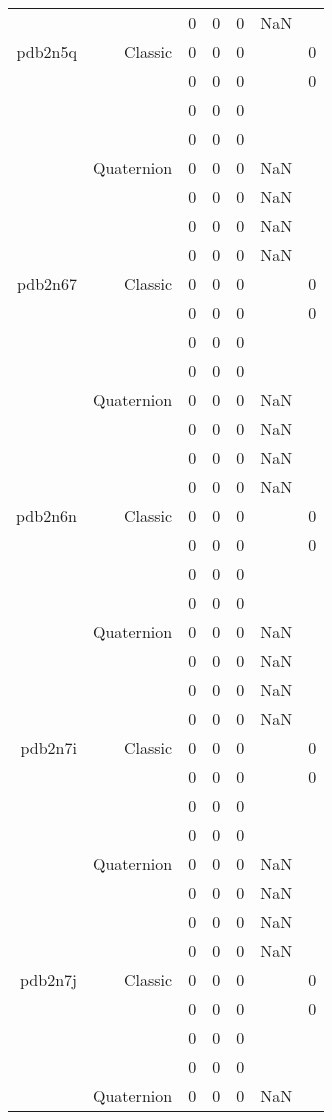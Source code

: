 \begin{xltabular}{\textwidth}{r|rcccSc}
& & 0 & 0 & 0 & NaN & \\ \addlinespace
pdb2n5q & Classic & 0 & 0 & 0 & & 0 \\
& & 0 & 0 & 0 & & 0 \\
& & 0 & 0 & 0 & & \\
& & 0 & 0 & 0 & & \\
& Quaternion & 0 & 0 & 0 & NaN & \\
& & 0 & 0 & 0 & NaN & \\
& & 0 & 0 & 0 & NaN & \\
& & 0 & 0 & 0 & NaN & \\ \addlinespace
pdb2n67 & Classic & 0 & 0 & 0 & & 0 \\
& & 0 & 0 & 0 & & 0 \\
& & 0 & 0 & 0 & & \\
& & 0 & 0 & 0 & & \\
& Quaternion & 0 & 0 & 0 & NaN & \\
& & 0 & 0 & 0 & NaN & \\
& & 0 & 0 & 0 & NaN & \\
& & 0 & 0 & 0 & NaN & \\ \addlinespace
pdb2n6n & Classic & 0 & 0 & 0 & & 0 \\
& & 0 & 0 & 0 & & 0 \\
& & 0 & 0 & 0 & & \\
& & 0 & 0 & 0 & & \\
& Quaternion & 0 & 0 & 0 & NaN & \\
& & 0 & 0 & 0 & NaN & \\
& & 0 & 0 & 0 & NaN & \\
& & 0 & 0 & 0 & NaN & \\ \addlinespace
pdb2n7i & Classic & 0 & 0 & 0 & & 0 \\
& & 0 & 0 & 0 & & 0 \\
& & 0 & 0 & 0 & & \\
& & 0 & 0 & 0 & & \\
& Quaternion & 0 & 0 & 0 & NaN & \\
& & 0 & 0 & 0 & NaN & \\
& & 0 & 0 & 0 & NaN & \\
& & 0 & 0 & 0 & NaN & \\ \addlinespace
pdb2n7j & Classic & 0 & 0 & 0 & & 0 \\
& & 0 & 0 & 0 & & 0 \\
& & 0 & 0 & 0 & & \\
& & 0 & 0 & 0 & & \\
& Quaternion & 0 & 0 & 0 & NaN & \\

\end{xltabular}
